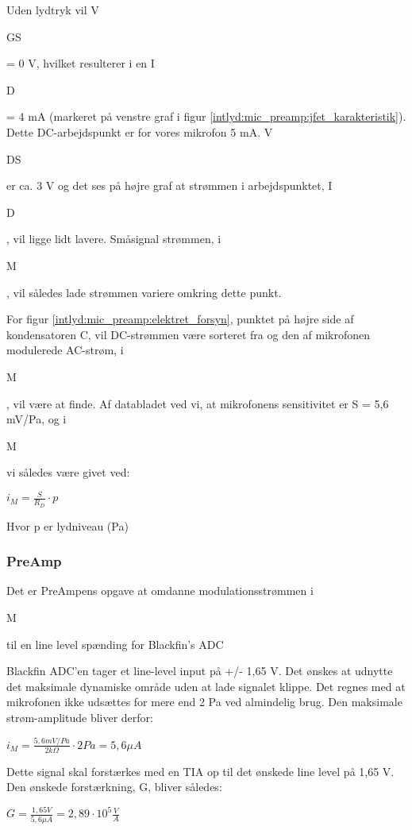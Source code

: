 Uden lydtryk vil V\begin{tiny}GS\end{tiny} = 0 V, hvilket resulterer i en I\begin{tiny}D\end{tiny}= 4 mA (markeret på venstre graf i figur \ref{intlyd:mic_preamp:jfet_karakteristik}). Dette DC-arbejdspunkt er for vores mikrofon 5 mA. V\begin{tiny}DS\end{tiny} er ca. 3 V og det ses på højre graf at strømmen i arbejdspunktet, I\begin{tiny}D\end{tiny}, vil ligge lidt lavere. Småsignal strømmen, i\begin{tiny}M\end{tiny}, vil således lade strømmen variere omkring dette punkt.

For figur \ref{intlyd:mic_preamp:elektret_forsyn}, punktet på højre side af kondensatoren C, vil DC-strømmen være sorteret fra og den af mikrofonen modulerede AC-strøm, i\begin{tiny}M\end{tiny}, vil være at finde. Af databladet ved vi, at mikrofonens sensitivitet er S = 5,6 mV/Pa, og i\begin{tiny}M\end{tiny} vi således være givet ved: 
\begin{center}
${ i }_{ M }=\frac { S }{ { R }_{ D } } \cdot p$
\end{center}
Hvor p er lydniveau (Pa)

\subsubsection{PreAmp} 
Det er PreAmpens opgave at omdanne modulationsstrømmen i\begin{tiny}M\end{tiny} til en line level spænding for Blackfin's ADC 

Blackfin ADC'en tager et line-level input på +/- 1,65 V. 
Det ønskes at udnytte det maksimale dynamiske område uden at lade signalet klippe. Det regnes med at mikrofonen ikke udsættes for mere end 2 Pa ved almindelig brug. Den maksimale strøm-amplitude bliver derfor: 
\begin{center}
${ i }_{ M }=\frac { 5,6mV/Pa }{ 2k\Omega  } \cdot 2Pa=5,6 \mu A$
\end{center}
Dette signal skal forstærkes med en TIA op til det ønskede line level på 1,65 V. Den ønskede forstærkning, G, bliver således:
\begin{center}
$G=\frac { 1,65V }{ 5,6\mu A } =2,89\cdot { 10 }^{ 5 }\frac { V }{ A } $
\end{center}

